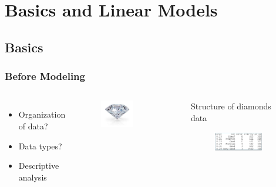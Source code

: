 \documentclass[
    utf8,
    aspectratio=169
]{beamer}  %
\begin{document}
\section{Basics and Linear Models}

\subsection{Basics}

\begin{frame}
\frametitle{Before Modeling}
\begin{columns}
	\begin{itemize}
		\item Organization of data?
		\item Data types?
		\item Descriptive analysis
	\end{itemize}
	\begin{figure}
		\includegraphics[width=0.6\textwidth]{pics/diamond.jpg}
	\end{figure}
	\begin{block}{Structure of diamonds data}
		\begin{figure}
			\includegraphics[width=0.95\textwidth]{pics/data_structure.png}
		\end{figure}
	\end{block}

	\begin{example}
	\end{example}
\end{columns}
\end{frame}
\end{document}
